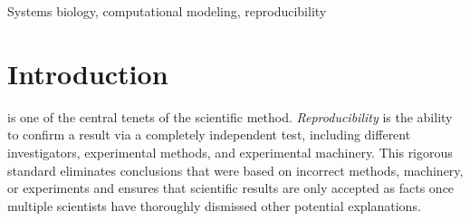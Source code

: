 \documentclass[journal,transmag,twoside]{IEEEtran}
\begin{document}
\begin{IEEEkeywords}
Systems biology, computational modeling, reproducibility
\end{IEEEkeywords}

\IEEEdisplaynontitleabstractindextext







%
\IEEEpeerreviewmaketitle



\section{Introduction}
% 
% 
% 
% 
 is one of the central tenets of the scientific method.
\textit{Reproducibility} is the ability to confirm a result via a completely independent test, including different investigators, experimental methods, and experimental machinery. 
This rigorous standard eliminates conclusions that were based on incorrect methods, machinery, or experiments and ensures that scientific results are only accepted as facts once multiple scientists have thoroughly dismissed other potential explanations. 
\end{document}
